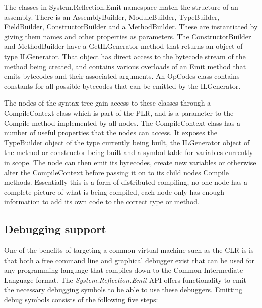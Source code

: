 	The classes in System.Reflection.Emit namespace match the structure of an 
	assembly. There is an \textsf{AssemblyBuilder}, \textsf{ModuleBuilder}, 
	\textsf{TypeBuilder}, \textsf{FieldBuilder}, \textsf{ConstructorBuilder} and 
	a \textsf{MethodBuilder}. These are instantiated by giving them names and 
	other properties as parameters. The \textsf{ConstructorBuilder} and 
	\textsf{MethodBuilder} have a \textsf{GetILGenerator} method that returns an 
	object of type \textsf{ILGenerator}. That object has direct access to the 
	bytecode stream of the method being created, and contains various overloads 
	of an \textsf{Emit} method that emits bytecodes and their associated 
	arguments. An \textsf{OpCodes} class contains constants for all possible 
	bytecodes that can be emitted by the \textsf{ILGenerator}.
	
	The nodes of the syntax tree gain access to these classes through a 
	\textsf{CompileContext} class which is part of the PLR, and is a parameter 
	to the \textsf{Compile} method implemented by all nodes. The 
	\textsf{CompileContext} class has a number of useful properties that the 
	nodes can access. It exposes the \textsf{TypeBuilder} object of the type 
	currently being built, the \textsf{ILGenerator} object of the method or 
	constructor being built and a symbol table for variables currently in scope. 
	The node can then emit its bytecodes, create new variables or otherwise 
	alter the \textsf{CompileContext} before passing it on to its child nodes 
	\textsf{Compile} methods. Essentially this is a form of distributed 
	compiling, no one node has a complete picture of what is being compiled, 
	each node only has enough information to add its own code to the correct 
	type or method.

\subsection{Debugging support}\label{debug_support}
	
	One of the benefits of targeting a common virtual machine such as the CLR is
	is that both a free command line and graphical debugger exist that can be 
	used for any programming language that compiles down to the Common 
	Intermediate Language format. The \textit{System.Reflection.Emit} API offers 
	functionality to emit the necessary debugging symbols to be able to use 
	these debuggers. Emitting debug symbols consists of the following five steps:
 	
